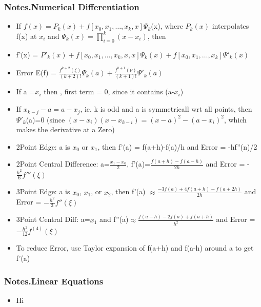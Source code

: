 \documentclass[12pt,letterpaper]{article}
\newcommand\asgnname{Notes}         %
\newenvironment{answer}[1]{
  \subsubsection*{%
  \asgnname.#1}
}{\newpage}
\begin{document}
\begin{answer}{Numerical Differentiation}
\begin{itemize}
    \item If $f(x) = P_k(x) + f[ x_0, x_1, \ldots, x_k, x ]\Psi_k$(x), where $P_k(x)$ interpolates f(x) at $x_i$ and $\Psi_k(x) = \prod_{i=0}^k(x-x_i)$, then
    \item f'(x) = $P'_k(x) + f[ x_0, x_1, \ldots, x_k, x, x]\Psi_k(x) + f[ x_0, x_1, \ldots, x_k ]\Psi '_k(x)$
    \item Error E(f) = $\frac{f^{k+2}(\xi)}{(k+2)!}\Psi_k(a) + \frac{f^{k+1}(\nu)}{(k+1)!}\Psi '_k(a)$ 
    \item If a =$x_i$ then , first term = 0, since it contains (a-$x_i$)
    \item If $x_{k-j} - a = a - x_j$, ie. k is odd and a is symmetricall wrt all points, then $\Psi '_k$(a)=0 (since $(x-x_i)(x-x_{k-i})=(x-a)^2-(a-x_i)^2$, which makes the derivative at a Zero)
    \item 2Point Edge: a is $x_0$ or $x_1$, then f'(a) = f(a+h)-f(a)/h and Error = -hf''(n)/2
    \item 2Point Central Difference: a=$\frac{x_1-x_0}{2}$, f'(a)=$\frac{f(a+h)-f(a-h)}{2h}$ and Error = -$\frac{h^2}{6}f'''(\xi)$
    \item 3Point Edge: a is $x_0$, $x_1$, or $x_2$, then f'(a) $\approx \frac{-3f(a)+4f(a+h)-f(a+2h)}{2h}$ and Error = $-\frac{h^2}{3}f''(\xi)$
    \item 3Point Central Diff: a=$x_1$ and f''(a)$\approx \frac{f(a-h)-2f(a)+f(a+h)}{h^2}$ and Error = $-\frac{h^2}{12}f^{(4)}(\xi)$
    \item To reduce Error, use Taylor expansion of f(a+h) and f(a-h) around a to get f'(a)
\end{itemize}
\end{answer}

\begin{answer}{Linear Equations}
\begin{itemize}
    \item Hi
\end{itemize}
\end{answer}
\end{document}
